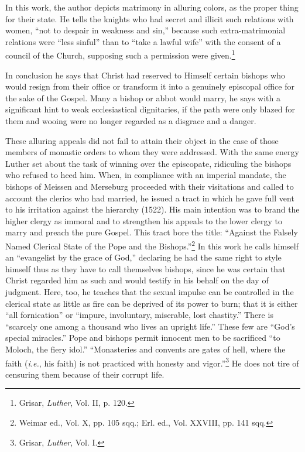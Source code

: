In this work, the author depicts matrimony in alluring colors, as the
proper thing for their state. He tells the knights who had secret and illicit
such relations with women, ``not to despair in weakness and sin,'' because such
extra-matrimonial relations were ``less sinful'' than to ``take a lawful wife''
with the consent of a council of the Church, supposing such a permission
were given.\footnote{Grisar, \textit{Luther}, Vol. II, p. 120.}

In conclusion he says that Christ had reserved to Himself certain bishops
who would resign from their office or transform it into a genuinely episcopal
office for the sake of the Gospel. Many a bishop or abbot would marry, he
says with a significant hint to weak ecclesiastical dignitaries, if the path
were only blazed for them and wooing were no longer regarded as a disgrace
and a danger.

These alluring appeals did not fail to attain their object in the
case of those members of monastic orders to whom they were addressed. With
the same energy Luther set about the task of winning
over the episcopate, ridiculing the bishops who refused to heed
him. When, in compliance with an imperial mandate, the bishops
of Meissen and Merseburg proceeded with their visitations and called
to account the clerics who had married, he issued a tract in which
he gave full vent to his irritation against the hierarchy (1522).
His main intention was to brand the higher clergy as immoral and
to strengthen his appeals to the lower clergy to marry and preach
the pure Gospel. This tract bore the title: “Against the Falsely Named
Clerical State of the Pope and the Bishops.”\footnote
{Weimar ed., Vol. X, pp. 105 sqq.; Erl. ed., Vol. XXVIII, pp. 141 sqq.}
In this work he calls
himself an “evangelist by the grace of God,” declaring he had the
same right to style himself thus as they have to call themselves
bishops, since he was certain that Christ regarded him as such and
would testify in his behalf on the day of judgment.
Here, too, he teaches that the sexual impulse can be controlled in the
clerical state as little as fire can be deprived of its power to burn; that it
is either “all fornication” or “impure, involuntary, miserable, lost chastity.”
There is “scarcely one among a thousand who lives an upright life.” These
few are “God’s special miracles.” Pope and bishops permit innocent men
to be sacrificed “to Moloch, the fiery idol.” “Monasteries and convents are
gates of hell, where the faith (\textit{i.e.}, his faith) is not practiced
with honesty and vigor.”\footnote{Grisar, \textit{Luther}, Vol. I.}
He does not tire of censuring them because of their corrupt life.

